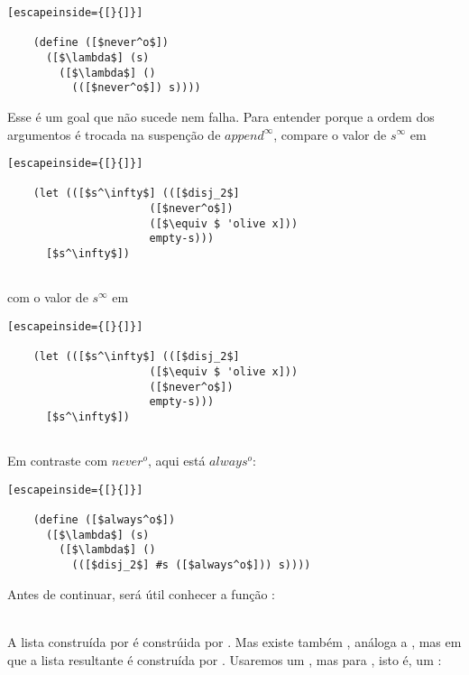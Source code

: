 \documentclass{article}
\begin{document}
  \begin{lstlisting}[escapeinside={[}{]}]

    (define ([$never^o$])
      ([$\lambda$] (s)
        ([$\lambda$] ()
          (([$never^o$]) s))))

  \end{lstlisting}

  \noindent Esse é um goal que não sucede nem falha. Para entender
  porque a ordem dos argumentos é trocada na suspenção de $append^\infty$,
  compare o valor de $s^\infty$ em

  \begin{lstlisting}[escapeinside={[}{]}]

    (let (([$s^\infty$] (([$disj_2$]
                      ([$never^o$])
                      ([$\equiv $ 'olive x]))
                      empty-s)))
      [$s^\infty$])
                      
  \end{lstlisting}

  \noindent com o valor de $s^\infty$ em

  \begin{lstlisting}[escapeinside={[}{]}]

    (let (([$s^\infty$] (([$disj_2$]
                      ([$\equiv $ 'olive x]))
                      ([$never^o$])
                      empty-s)))
      [$s^\infty$])
                      
  \end{lstlisting}

  Em contraste com $never^o$, aqui está $always^o$:

  \begin{lstlisting}[escapeinside={[}{]}]

    (define ([$always^o$])
      ([$\lambda$] (s)
        ([$\lambda$] ()
          (([$disj_2$] #s ([$always^o$])) s))))

  \end{lstlisting}

  Antes de continuar, será útil conhecer a função :\\
   \seta\ 

  \noindent A lista construída por  é constrúida por
  . Mas existe também , análoga
  a , mas em que a lista resultante é construída por
  . Usaremos um , mas para
  , isto é, um :
\end{document}
